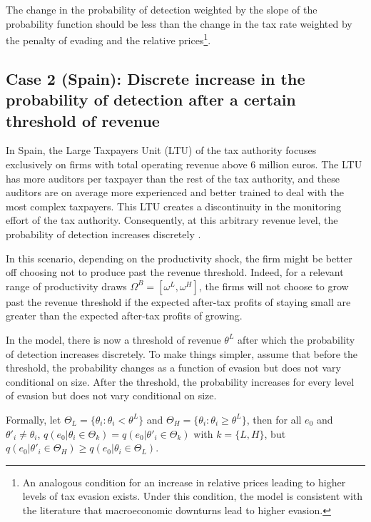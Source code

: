 \documentclass[
  12pt]{article}
\begin{document}
The change in the probability of detection weighted by the slope of the
probability function should be less than the change in the tax rate
weighted by the penalty of evading and the relative prices\footnote{An
  analogous condition for an increase in relative prices leading to
  higher levels of tax evasion exists. Under this condition, the model
  is consistent with the literature that macroeconomic downturns lead to
  higher evasion.}.

\hypertarget{case-2-spain-discrete-increase-in-the-probability-of-detection-after-a-certain-threshold-of-revenue}{%
\subsection{Case 2 (Spain): Discrete increase in the probability of
detection after a certain threshold of
revenue}\label{case-2-spain-discrete-increase-in-the-probability-of-detection-after-a-certain-threshold-of-revenue}}

In Spain, the Large Taxpayers Unit (LTU) of the tax authority focuses
exclusively on firms with total operating revenue above 6 million euros.
The LTU has more auditors per taxpayer than the rest of the tax
authority, and these auditors are on average more experienced and better
trained to deal with the most complex taxpayers. This LTU creates a
discontinuity in the monitoring effort of the tax authority.
Consequently, at this arbitrary revenue level, the probability of
detection increases discretely \citep{Almunia2018}.

In this scenario, depending on the productivity shock, the firm might be
better off choosing not to produce past the revenue threshold. Indeed,
for a relevant range of productivity draws
\(\Omega^B=[\omega^L, \omega^H]\), the firms will not choose to grow
past the revenue threshold if the expected after-tax profits of staying
small are greater than the expected after-tax profits of growing.

In the model, there is now a threshold of revenue \(\theta^L\) after
which the probability of detection increases discretely. To make things
simpler, assume that before the threshold, the probability changes as a
function of evasion but does not vary conditional on size. After the
threshold, the probability increases for every level of evasion but does
not vary conditional on size.

Formally, let \(\Theta_{L} = \{\theta_i : \theta_{i} < \theta^L \}\) and
\(\Theta_{H} = \{\theta_i : \theta_{i} \ge \theta^L \}\), then for all
\(e_0\) and \(\theta'_i\not=\theta_i\),
\(q(e_0|\theta_i \in \Theta_k)=q(e_0|\theta'_i \in \Theta_k)\) with
\(k=\{L,H\}\), but
\(q(e_0|\theta'_i \in \Theta_H)\ge q(e_0|\theta_i \in \Theta_L)\).
\end{document}
